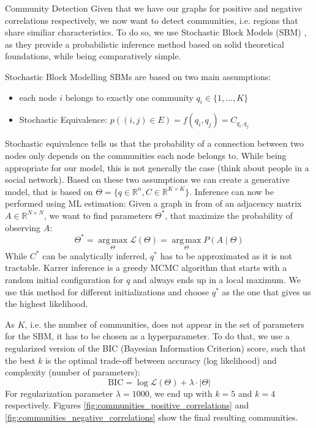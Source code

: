 \documentclass[12pt]{article}
\DeclareMathOperator*{\argmax}{arg\,max}
\begin{document}
\begin{section}{Community Detection}
Given that we have our graphs for positive and negative correlations respectively, we now want to detect communities, i.e. regions that share similiar characteristics. To do so, we use Stochastic Block Models (SBM) \citep{sbms}, as they provide a probabilistic inference method based on solid theoretical foundations, while being comparatively simple. 

\begin{subsection}{Stochastic Block Modelling}
SBMs are based on two main assumptions: 
\begin{itemize}
    \item each node $i$ belongs to exactly one community $q_i \in \{1, \dots, K\}$
    \item Stochastic Equivalence: $p((i,j) \in E) = f(q_i, q_j) = C_{q_i, q_j}$
\end{itemize}
Stochastic equivalence tells us that the probability of a connection between two nodes only depends on the communities each node belongs to.
While being appropriate for our model, this is not generally the case (think about people in a social network).
Based on these two assumptions we can create a generative model, that is based on $\Theta = \{q \in \mathbb{R}^n, C \in \mathbb{R}^{K\times K} \}$.
Inference can now be performed using ML estimation: Given a graph in from of an adjacency matrix $A \in \mathbb{R}^{N \times N}$, we want to find parameters $\Theta^*$, that maximize the probability of observing $A$: 
\begin{equation}
    \Theta^* = \argmax\limits_\Theta \mathcal{L}(\Theta) = \argmax\limits_\Theta P(A\mid \Theta)
\end{equation}
While $C^*$ can be analytically inferred, $q^*$ has to be approximated as it is not tractable. 
Karrer inference \citep{karrer_inference} is a greedy MCMC algorithm that starts with a random initial configuration for $q$ and always ends up in a local maximum. 
We use this method for different initializations and choose $q^*$ as the one that gives us the highest likelihood.
\end{subsection}

As $K$, i.e. the number of communities, does not appear in the set of parameters for the SBM, it has to be chosen as a hyperparameter.
To do that, we use a regularized version of the BIC (Bayesian Information Criterion) score, such that the best $k$ is the optimal trade-off between accuracy (log likelihood) and complexity (number of parameters):
\begin{equation}
    \text{BIC} = \log\mathcal{L}(\Theta) + \lambda \cdot |\Theta|
\end{equation}
For regularization parameter $\lambda=1000$, we end up with $k=5$ and $k=4$ respectively.
Figures \ref{fig:communities_positive_correlations} and \ref{fig:communities_negative_correlations} show the final resulting communities.


\end{section}
\end{document}
